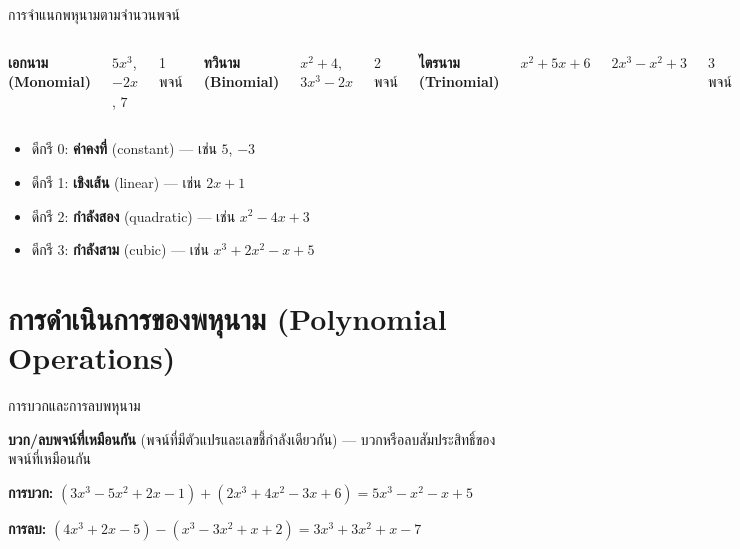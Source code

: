 \documentclass[11pt, aspectratio=169]{beamer}
\begin{document}
\begin{frame}{การจำแนกพหุนามตามจำนวนพจน์}
  \begin{columns}[T]
      \centering
      \textbf{เอกนาม (Monomial)}

      $5x^3$, \quad $-2x$, \quad $7$

      1 พจน์

      \centering
      \textbf{ทวินาม (Binomial)}

      $x^2 + 4$, \quad $3x^3 - 2x$

      2 พจน์

      \centering
      \textbf{ไตรนาม (Trinomial)}

      $x^2 + 5x + 6$

      $2x^3 - x^2 + 3$

      3 พจน์
  \end{columns}

  \medskip
  \begin{explanation}[การจำแนกตามดีกรี]
    \begin{itemize}
      \item ดีกรี 0: \textbf{ค่าคงที่} (constant) — เช่น $5$, $-3$
      \item ดีกรี 1: \textbf{เชิงเส้น} (linear) — เช่น $2x + 1$
      \item ดีกรี 2: \textbf{กำลังสอง} (quadratic) — เช่น $x^2 - 4x + 3$
      \item ดีกรี 3: \textbf{กำลังสาม} (cubic) — เช่น $x^3 + 2x^2 - x + 5$
    \end{itemize}
  \end{explanation}
\end{frame}

\section{การดำเนินการของพหุนาม (Polynomial Operations)}

\begin{frame}{การบวกและการลบพหุนาม}
  \begin{explanation}[วิธีทำ]
    \textbf{บวก/ลบพจน์ที่เหมือนกัน} (พจน์ที่มีตัวแปรและเลขชี้กำลังเดียวกัน)
    — บวกหรือลบสัมประสิทธิ์ของพจน์ที่เหมือนกัน
  \end{explanation}

  \begin{exambox}[ตัวอย่าง]
    \textbf{การบวก:} $(3x^3 - 5x^2 + 2x - 1) + (2x^3 + 4x^2 - 3x + 6)
    = 5x^3 - x^2 - x + 5$

    \medskip
    \textbf{การลบ:} $(4x^3 + 2x - 5) - (x^3 - 3x^2 + x + 2)
    = 3x^3 + 3x^2 + x - 7$
  \end{exambox}
\end{frame}
\end{document}
